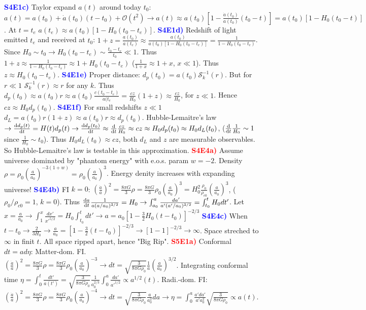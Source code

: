 \documentclass[landscape, a4paper,1pt,english]{article}
\begin{document}
{{{\begin{multicols}{5}
\textcolor{blue}{\textbf{S4E1c)}} Taylor expand $a(t)$ around today $t_0$: $a(t) = a(t_0) + \dot{a}(t_0)(t - t_0) + \mathcal{O}(t^2)\rightarrow a(t)\approx a(t_0)[1-\frac{\dot{a}(t_0)}{a(t_0)}(t_0 - t)] = a(t_0)[1-H_0(t_0 - t)]$. At $t = t_e$ $a(t_e)\approx a(t_0)[1-H_0(t_0-t_e)]$. 
\textcolor{blue}{\textbf{S4E1d)}} Redshift of light emitted $t_e$ and received at $t_0$: $1+z = \frac{a(t_0)}{a(t_e)}\approx\frac{a(t_0)}{a(t_0)[1-H_0(t_0 - t_e)]} = \frac{1}{1-H_0(t_0-t_e)}$. Since $H_0\sim t_0\rightarrow H_0(t_0 - t_e)\sim \frac{t_0 - t_e}{t_0}\ll1$. Thus $1+z\approx\frac{1}{1-H_0(t_0-t_e)}\approx1+H_0(t_0-t_e)$ ($\frac{1}{1+x}\approx 1+x$, $x\ll1$). Thus $z\approx H_0(t_0-t_e)$.
\textcolor{blue}{\textbf{S4E1e)}} Proper distance: $d_p(t_0) = a(t_0)\mathcal{S}_k^{-1}(r)$. But for $r\ll1$ $\mathcal{S}_k^{-1}(r)\approx r$ for any $k$. Thus $d_p(t_0)\approx a(t_0)r\approx a(t_0)\frac{c(t_0-t_e)}{a(t_e} = \frac{cz}{H_0}(1+z)\approx \frac{cz}{H_0}$, for $z\ll1$. Hence $cz\approx H_0 d_p(t_0)$. 
\textcolor{blue}{\textbf{S4E1f)}} For small redshifts $z\ll1$ $d_L = a(t_0)r(1+z)\approx a(t_0)r \approx d_p(t_0)$. Hubble-Lemaitre's law $\rightarrow \dv{d_p(t)}{t} = H(t)d_p(t)\rightarrow \dv{d_p(t_0)}{t}\approx \dv{t}\frac{cz}{H_0}\approx cz\approx H_0 d_p(t_0)\approx H_0d_L(t_0)$, ($\dv{t}\frac{1}{H_0}\sim 1$ since $\frac{1}{H_0}\sim t_0$). Thus $H_0 d_L(t_0)\approx cz$, both $d_L$ and $z$ are measurable observables. So Hubble-Lemaitre's law is testable in this approximation.
\textcolor{red}{\textbf{S4E4a)}} Assume universe dominated by "phantom energy" with e.o.s. param $w=-2$. Density $\rho = \rho_0\left(\frac{a}{a_0}\right)^{-3(1+w)} = \rho_0\left(\frac{a}{a_0}\right)^3$. Energy denity increases with expanding universe!
\textcolor{blue}{\textbf{S4E4b)}} FI $k=0$: $\left(\frac{\dot{a}}{a}\right)^2 = \frac{8\pi G}{3}\rho = \frac{8\pi G}{3}\rho_0\left(\frac{a}{a_0}\right)^3 = H_0^2\frac{\rho_0}{\rho_{c0}}\left(\frac{a}{a_0}\right)^3$, ($\rho_0/\rho_{c0} = 1$, $k=0$). Thus $\dv{a}{t}\frac{1}{a(a/a_0)^{3/2}} = H_0\rightarrow \int_{a_0}^{a}\frac{da'}{a'(a'/a_0)^{3/2}} = \int_{t_0}^{t}H_0 dt'$. Let $x = \frac{a}{a_0}\rightarrow \int_{1}^{x}\frac{dx'}{x'^{5/2}} = H_0\int_{t_0}^{t}dt'\rightarrow a = a_0\left[1-\frac{3}{2}H_0(t-t_0)\right]^{-2/3}$ 
\textcolor{blue}{\textbf{S4E4c)}} When $t-t_0\to \frac{2}{3H_0}\rightarrow\frac{a}{a_0} = [1-\frac{3}{2}(t-t_0)]^{-2/3}\to[1-1]^{-2/3}\to \infty$. Space streched to $\infty$ in finit $t$. All space ripped apart, hence "Big Rip".
\textcolor{red}{\textbf{S5E1a)}} Conformal $dt = a d\eta$: Matter-dom. FI. $\left(\frac{\dot{a}}{a}\right)^2 = \frac{8\pi G}{3}\rho = \frac{8\pi G}{3}\rho_0\left(\frac{a}{a_0}\right)^{-3}\rightarrow dt = \sqrt{\frac{3}{8\pi G\rho_0}}\frac{1}{a}\left(\frac{a}{a_0}\right)^{3/2}$. Integrating conformal time $\eta = \int_{0}^{t}\frac{dt'}{a(t')} = \sqrt{\frac{3}{8\pi G \rho_0}}\frac{1}{a_0^{2/3}}\int_{0}^{a}\frac{da'}{a'^{1/2}} \propto a^{1/2}(t)$. Radi.-dom. FI: $\left(\frac{\dot{a}}{a}\right)^2 = \frac{8\pi G}{3}\rho = \frac{8\pi G}{3}\rho_0\left(\frac{a}{a_0}\right)^{-4}\rightarrow dt = \sqrt{\frac{3}{8\pi G\rho_0}}\frac{a}{a_0^2}da\rightarrow\eta = \int_{0}^{a}\frac{a'da'}{a'a_0^2}\sqrt{\frac{3}{8\pi G \rho_0}} \propto a(t)$.

\end{multicols}}}}
\end{document}
